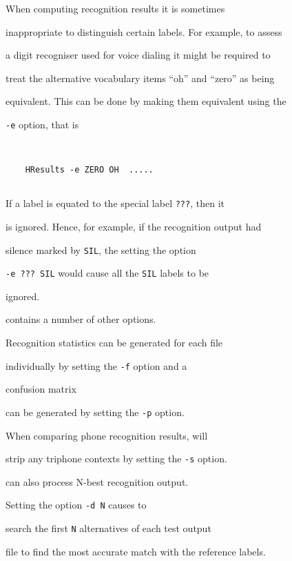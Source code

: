 When computing recognition results it is sometimes


inappropriate to distinguish certain labels.  For example, to assess


a digit recogniser used for voice dialing it might be required to


treat the alternative vocabulary items ``oh'' and ``zero'' as being


equivalent.  This can be done by making them equivalent using the


\texttt{-e} option, that is


\begin{verbatim}


    HResults -e ZERO OH  .....


\end{verbatim}


If a label is equated to the special label \verb+???+, then it 


is ignored.  Hence, for example, if the recognition output had


silence marked by \texttt{SIL}, the setting the option


\verb+-e ??? SIL+ would cause all the \texttt{SIL} labels to be


ignored.





 contains a number of other options.


Recognition statistics can be generated for each file


individually by setting the {\tt -f} option and a 


confusion matrix


can be generated by setting the  {\tt -p} option.


When comparing phone recognition results,  will


strip any triphone contexts by setting the  {\tt -s} option.


 can also process N-best recognition output.


Setting the option \texttt{-d N} causes  to


search the first \texttt{N} alternatives of each test output


file to find the most accurate match with the reference labels.





